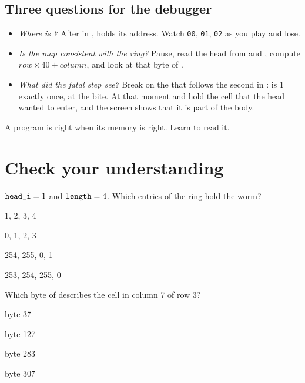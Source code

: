 \subsection{Three questions for the debugger}

\begin{itemize}
\item \emph{Where is ?} After  in
  ,  holds its address. Watch \texttt{00},
  \texttt{01}, \texttt{02} as you play and lose.
\item \emph{Is the map consistent with the ring?} Pause, read the head from
   and , compute
  $\mathit{row}\times 40+\mathit{column}$, and look at that byte of
  .
\item \emph{What did the fatal step see?} Break on the  that follows
  the second  in :  is 1 exactly once, at the
  bite. At that moment  and  hold the cell that the head
  wanted to enter, and the screen shows that it is part of the body.
\end{itemize}

\begin{prgconcept}
A program is right when its memory is right. Learn to read it.
\end{prgconcept}



\section{Check your understanding}

\begin{quiz}{$\texttt{head\_i}=1$ and $\texttt{length}=4$. Which entries of the ring hold the worm?}
\item 1, 2, 3, 4
\item 0, 1, 2, 3
\item 254, 255, 0, 1
\item 253, 254, 255, 0
\end{quiz}

\begin{quiz}{Which byte of  describes the cell in column 7 of row 3?}
\item byte 37
\item byte 127
\item byte 283
\item byte 307
\end{quiz}

